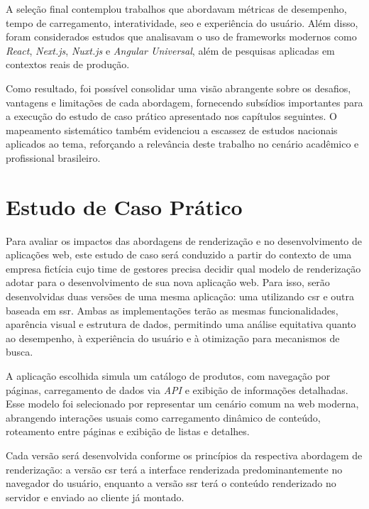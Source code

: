 A seleção final contemplou trabalhos que abordavam métricas de desempenho, tempo de carregamento, interatividade, \acrshort{seo} e experiência do usuário. Além disso, foram considerados estudos que analisavam o uso de frameworks modernos como \textit{React}, \textit{Next.js}, \textit{Nuxt.js} e \textit{Angular Universal}, além de pesquisas aplicadas em contextos reais de produção.

Como resultado, foi possível consolidar uma visão abrangente sobre os desafios, vantagens e limitações de cada abordagem, fornecendo subsídios importantes para a execução do estudo de caso prático apresentado nos capítulos seguintes. O mapeamento sistemático também evidenciou a escassez de estudos nacionais aplicados ao tema, reforçando a relevância deste trabalho no cenário acadêmico e profissional brasileiro.


\section{Estudo de Caso Prático}
\label{sec:estudo-de-caso-pratico}

Para avaliar os impactos das abordagens de renderização  e  no desenvolvimento de aplicações web, este estudo de caso será conduzido a partir do contexto de uma empresa fictícia cujo time de gestores precisa decidir qual modelo de renderização adotar para o desenvolvimento de sua nova aplicação web. Para isso, serão desenvolvidas duas versões de uma mesma aplicação: uma utilizando \acrshort{csr} e outra baseada em \acrshort{ssr}. Ambas as implementações terão as mesmas funcionalidades, aparência visual e estrutura de dados, permitindo uma análise equitativa quanto ao desempenho, à experiência do usuário e à otimização para mecanismos de busca.

A aplicação escolhida simula um catálogo de produtos, com navegação por páginas, carregamento de dados via \textit{API} e exibição de informações detalhadas. Esse modelo foi selecionado por representar um cenário comum na web moderna, abrangendo interações usuais como carregamento dinâmico de conteúdo, roteamento entre páginas e exibição de listas e detalhes.

Cada versão será desenvolvida conforme os princípios da respectiva abordagem de renderização: a versão \acrshort{csr} terá a interface renderizada predominantemente no navegador do usuário, enquanto a versão \acrshort{ssr} terá o conteúdo renderizado no servidor e enviado ao cliente já montado.

